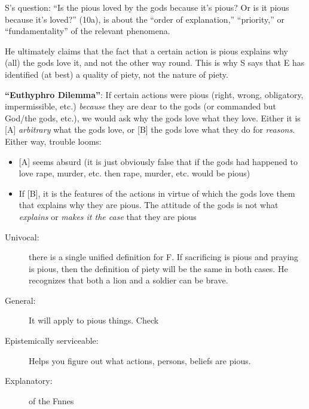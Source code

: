 \documentclass[11pt]{article}
\begin{document}
\noindent S's question: ``Is the pious loved by the gods because it's pious? Or is it pious because it's loved?'' (10a), is about the ``order of explanation,'' ``priority,'' or ``fundamentality'' of the relevant phenomena.
\vspace*{2mm}

\noindent He ultimately claims that the fact that a certain action is pious explains why (all) the gods love it, and not the other way round. This is why S says that E has identified (at best) a quality of piety, not the nature of piety.
\vspace*{2mm}




\noindent \textbf{``Euthyphro Dilemma''}: If certain actions were pious (right, wrong, obligatory, impermissible, etc.) \emph{because} they are dear to the gods (or commanded but God/the gods, etc.), we would ask why the gods love what they love. Either it is [A] \emph{arbitrary} what the gods love, or [B] the gods love what they do for \emph{reasons}. Either way, trouble looms:\begin{itemize}\item{[A] seems absurd (it is just obviously false that if the gods had happened to love rape, murder, etc. then rape, murder, etc. would be pious)}\item{If [B], it is the features of the actions in virtue of which the gods love them that explains why they are pious. The attitude of the gods is not what \emph{explains} or \emph{makes it the case} that they are pious} \end{itemize}


\begin{description}
\item[Univocal:] there is a single unified definition for F. If sacrificing is pious and praying is pious, then the definition of piety will be the same in both cases. He recognizes that both a lion and a soldier can be brave.
\item[General:] It will apply to pious things. Check
\item[Epistemically serviceable:] Helps you figure out what actions, persons, beliefs are pious.
\item[Explanatory:] of the Fnnes
\end{description}
\end{document}
